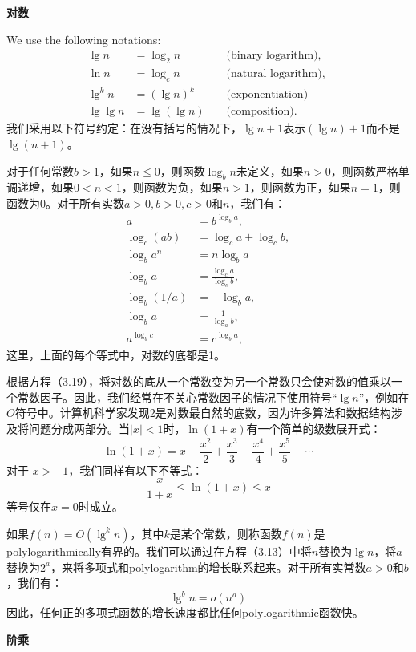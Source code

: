 \documentclass[lang=cn,newtx,10pt,scheme=chinese]{elegantbook}
\begin{document}
\textbf{对数}

We use the following notations:
$$
\begin{aligned}
\lg n & =\log _2 n & & \text { (binary logarithm), } \\
\ln n & =\log _e n & & \text { (natural logarithm), } \\
\lg ^k n & =(\lg n)^k & & \text { (exponentiation) } \\
\lg \lg n & =\lg (\lg n) & & \text { (composition). }
\end{aligned}
$$
我们采用以下符号约定：在没有括号的情况下，$\lg n+1$表示$(\lg n)+1$而不是$\lg (n+1)$。

对于任何常数$b>1$，如果$n \leq 0$，则函数$\log _b n$未定义，如果$n>0$，则函数严格单调递增，如果$0<n<1$，则函数为负，如果$n>1$，则函数为正，如果$n=1$，则函数为0。对于所有实数$a>0, b>0, c>0$和$n$，我们有：
$$
\begin{aligned}
a & =b^{\log _b a}, \\
\log _c(a b) & =\log _c a+\log _c b, \\
\log _b a^n & =n \log _b a \\
\log _b a & =\frac{\log _c a}{\log _c b}, \\
\log _b(1 / a) & =-\log _b a, \\
\log _b a & =\frac{1}{\log _a b}, \\
a^{\log _b c} & =c^{\log _b a},
\end{aligned}
$$
这里，上面的每个等式中，对数的底都是1。

根据方程（3.19），将对数的底从一个常数变为另一个常数只会使对数的值乘以一个常数因子。因此，我们经常在不关心常数因子的情况下使用符号“$\lg n$”，例如在$O$符号中。计算机科学家发现2是对数最自然的底数，因为许多算法和数据结构涉及将问题分成两部分。当$|x|<1$时，$\ln (1+x)$有一个简单的级数展开式：
$$
\ln (1+x)=x-\frac{x^2}{2}+\frac{x^3}{3}-\frac{x^4}{4}+\frac{x^5}{5}-\cdots
$$
对于 $x>-1$，我们同样有以下不等式：
$$
\frac{x}{1+x} \leq \ln (1+x) \leq x
$$
等号仅在$x=0$时成立。

如果$f(n)=O\left(\lg ^k n\right)$，其中$k$是某个常数，则称函数$f(n)$是polylogarithmically有界的。我们可以通过在方程（3.13）中将$n$替换为$\lg n$，将$a$替换为$2^a$，来将多项式和polylogarithm的增长联系起来。对于所有实常数$a>0$和$b$，我们有：
$$
\lg ^b n=o\left(n^a\right)
$$
因此，任何正的多项式函数的增长速度都比任何polylogarithmic函数快。

\textbf{阶乘}
\end{document}
